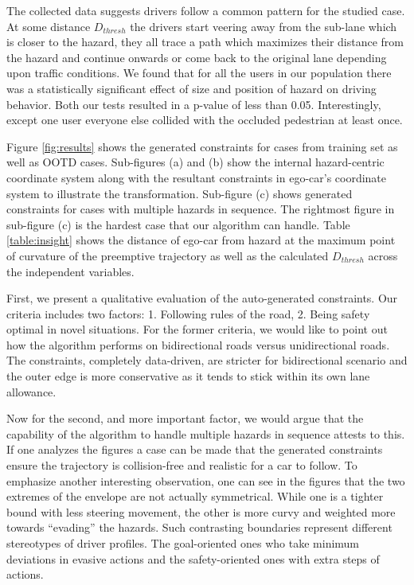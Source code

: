 \documentclass{article}
\begin{document}
The collected data suggests drivers follow a common pattern for the studied case. At some distance
$D_{thresh}$ the drivers start veering away from the sub-lane which is closer to the hazard, they all
trace a path which maximizes their distance from the hazard and continue onwards or come back to 
the original lane depending upon traffic conditions. We found that for all the users in our population 
there was a statistically significant effect of size and position of hazard on driving behavior. 
Both our tests resulted in a p-value of less than 0.05. Interestingly, except one user 
everyone else collided with the occluded pedestrian at least once.

Figure \ref{fig:results} shows the generated constraints for cases from training set as well as OOTD
cases. Sub-figures (a) and (b) show the internal hazard-centric coordinate system
along with the resultant constraints in ego-car's coordinate system to illustrate the
transformation. Sub-figure (c) shows generated constraints for cases with multiple hazards
in sequence. The rightmost figure in sub-figure (c) is the hardest case that our algorithm
can handle.
Table \ref{table:insight} shows the distance of ego-car from
hazard at the maximum point of curvature of the preemptive trajectory as well as the 
calculated $D_{thresh}$ 
across the independent variables. 

First, we present a qualitative evaluation of the auto-generated constraints. 
Our criteria includes two factors: 1. Following rules of the road, 2. Being safety optimal 
in novel situations. For the former criteria, we would like to point out how the algorithm 
performs on bidirectional roads versus unidirectional roads. The constraints, completely
data-driven, are stricter for bidirectional scenario and the outer edge is more 
conservative as it tends to stick within its own lane allowance.

Now for the second, and more important factor, we would argue that the capability of the 
algorithm to handle multiple hazards in sequence attests to this. If one analyzes 
the figures a case can be made that the generated constraints ensure the trajectory is 
collision-free and realistic for a car to follow. 
To emphasize another interesting observation, one can see in the figures that the two 
extremes of the envelope are not actually symmetrical. While one is a tighter bound with 
less steering movement, the other is more curvy and weighted more towards ``evading'' the 
hazards. Such contrasting boundaries represent different stereotypes of driver profiles. 
The goal-oriented ones who take minimum deviations in evasive actions and the 
safety-oriented ones with extra steps of actions.
\end{document}
